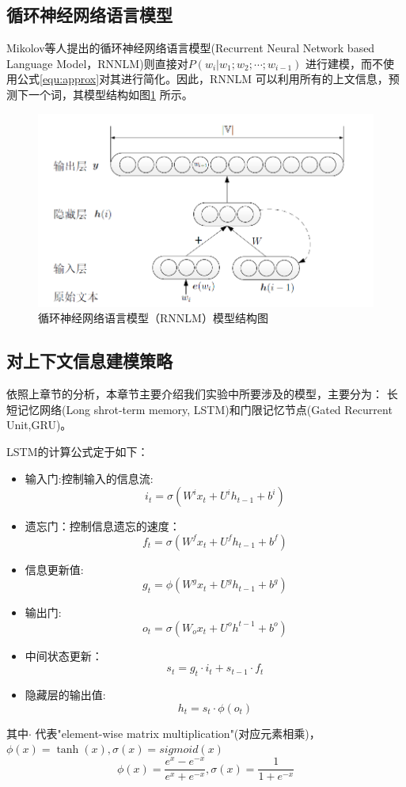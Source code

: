 \documentclass[12pt,a4paper]{article}
\begin{document}
\subsection{循环神经网络语言模型}
Mikolov等人提出的循环神经网络语言模型(Recurrent Neural Network based Language Model，RNNLM)则直接对$P(w_i | w_1;w_2;\cdots;w_{i-1}) $ 进行建模，而不使用公式\ref{equ:approx}对其进行简化\cite{mikolov2012statistical,DBLP:conf/interspeech/MikolovKBCK10}。因此，RNNLM 可以利用所有的上文信息，预测下一个词，其模型结构如图\ref{fig:rnnlm} 所示。
\begin{figure}
  \centering
  \includegraphics[width=0.85\linewidth]{./figures/rnnlm.png}
  \caption{循环神经网络语言模型（RNNLM）模型结构图}\label{fig:rnnlm}
\end{figure}




\subsection{对上下文信息建模策略}
依照上章节的分析，本章节主要介绍我们实验中所要涉及的模型，主要分为： 长短记忆网络(Long shrot-term memory, LSTM)和门限记忆节点(Gated Recurrent Unit,GRU)。

LSTM的计算公式定于如下：
\begin{itemize}
\item 输入门:控制输入的信息流:
$$i_t=\sigma(W^i x_t+U^i h_{t-1}+b^i)$$
\item  遗忘门：控制信息遗忘的速度：
$$f_t=\sigma(W^f x_t+U^f h_{t-1}+b^f)$$
\item  信息更新值:
$$g_t=\phi(W^g x_t+U^g h_{t-1}+b^g)$$
\item  输出门:
$$o_t=\sigma(W_o x_t+U^o h^{t-1}+b^o)$$
\item  中间状态更新：
$$s_t=g_t\cdot i_t+s_{t-1}\cdot f_t$$
\item  隐藏层的输出值:
$$h_t=s_t\cdot \phi(o_t)$$
\end{itemize}
其中$\cdot$ 代表"element-wise matrix multiplication"(对应元素相乘)，$\phi(x)=\tanh(x),\sigma(x)=sigmoid(x)$
$$\phi(x)=\frac{e^x-e^{-x}}{e^x+e^{-x}},\sigma(x)=\frac{1}{1+e^{-x}}$$
\end{document}
